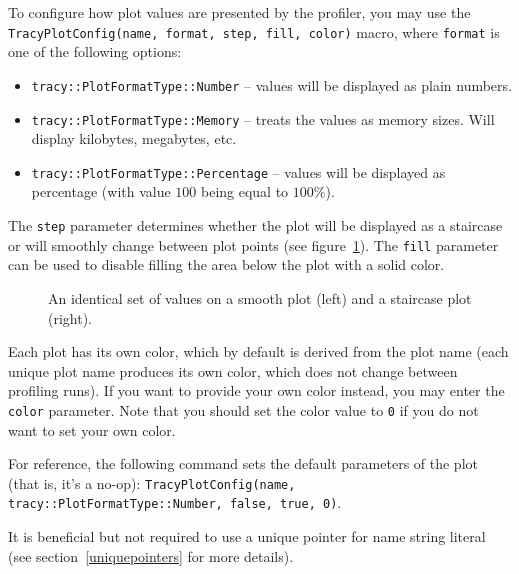 \documentclass[hidelinks,titlepage,a4paper,twoside]{article}
\begin{document}
To configure how plot values are presented by the profiler, you may use the \texttt{TracyPlotConfig(name, format, step, fill, color)} macro, where \texttt{format} is one of the following options:

\begin{itemize}
\item \texttt{tracy::PlotFormatType::Number} -- values will be displayed as plain numbers.
\item \texttt{tracy::PlotFormatType::Memory} -- treats the values as memory sizes. Will display kilobytes, megabytes, etc.
\item \texttt{tracy::PlotFormatType::Percentage} -- values will be displayed as percentage (with value $100$ being equal to $100\%$).
\end{itemize}

The \texttt{step} parameter determines whether the plot will be displayed as a staircase or will smoothly change between plot points (see figure~\ref{plotconfig}). The \texttt{fill} parameter can be used to disable filling the area below the plot with a solid color.

\begin{figure}[h]
\centering{}
\caption{An identical set of values on a smooth plot (left) and a staircase plot (right).}
\label{plotconfig}
\end{figure}

Each plot has its own color, which by default is derived from the plot name (each unique plot name produces its own color, which does not change between profiling runs). If you want to provide your own color instead, you may enter the \texttt{color} parameter. Note that you should set the color value to \texttt{0} if you do not want to set your own color.

For reference, the following command sets the default parameters of the plot (that is, it's a no-op): \texttt{TracyPlotConfig(name, tracy::PlotFormatType::Number, false, true, 0)}.

It is beneficial but not required to use a unique pointer for name string literal (see section~\ref{uniquepointers} for more details).
\end{document}
